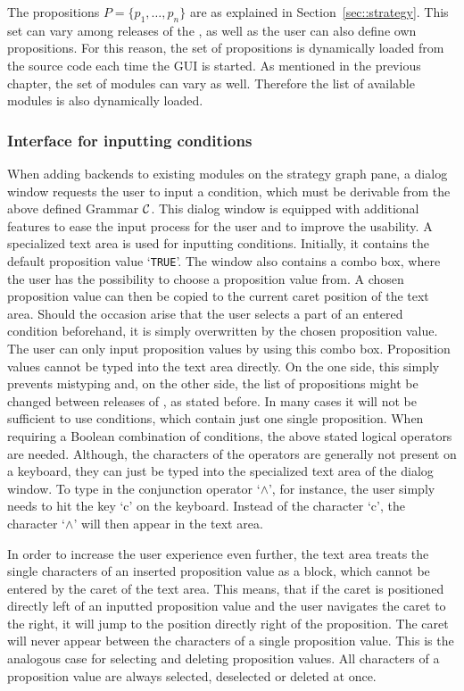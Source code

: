 The propositions $P = \{p_1, \dots, p_n\}$ are as explained in Section~\ref{sec::strategy}. 
This set can vary among releases of the \smtrat, as well as the user can also 
define own propositions. For this reason, the set of propositions is dynamically 
loaded from the \smtrat source code each time the GUI is started. As mentioned in 
the previous chapter, the set of \smtrat modules can vary as well. Therefore the 
list of available \smtrat modules is also dynamically loaded.

\subsubsection{Interface for inputting conditions}
\label{subsec:improved_interface_for_inputting_conditions}
When adding backends to existing modules on the strategy graph pane, a dialog window
requests the user to input a condition, which must be derivable from the 
above defined Grammar $\cal C$. This dialog window is equipped with additional 
features to ease the input process for the user and to improve the usability. 
A specialized text area is used for inputting conditions. Initially, it contains
the default proposition value `\texttt{TRUE}'. The window also contains a combo box, 
where the user has the possibility to choose a proposition value from. A chosen 
proposition value can then be copied to the current caret position of the text area. 
Should the occasion arise that the user selects a part of an entered condition 
beforehand, it is simply overwritten by the chosen proposition value. The user can
only input proposition values by using this combo box. Proposition values cannot
be typed into the text area directly. On the one side, this simply prevents mistyping
and, on the other side, the list of propositions might be changed between releases
of \smtrat, as stated before. In many cases it will not be sufficient to use conditions,
which contain just one single proposition. When requiring a Boolean combination of 
conditions, the above stated logical operators are needed. Although, the 
characters of the operators are generally not present on a keyboard, they can just
be typed into the specialized text area of the dialog window. To type in the 
conjunction operator `$\land$', for instance, the user simply needs to hit the 
key `c' on the keyboard. Instead of the character `c', the character `$\land$' 
will then appear in the text area.

In order to increase the user experience even further, the text area treats the
single characters of an inserted proposition value as a block, which cannot be
entered by the caret of the text area. This means, that if the caret is positioned
directly left of an inputted proposition value and the user navigates the caret to
the right, it will jump to the position directly right of the proposition. The
caret will never appear between the characters of a single proposition value. This
is the analogous case for selecting and deleting proposition values. All characters
of a proposition value are always selected, deselected or deleted at once.

